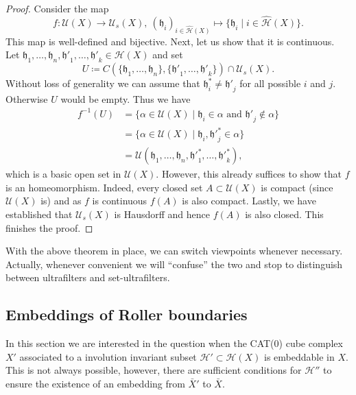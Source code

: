 \begin{proof}
  Consider the map
  \[
    f\colon \mathcal{U}(X) \to \mathcal{U}_s(X),\ (\mathfrak{h}_i)_{i \in \mathcal{\hat H}(X)} \mapsto \{\mathfrak{h}_i \mid i \in \mathcal{\hat H}(X)\}.
  \]
  This map is well-defined and bijective. Next, let us show that it is continuous. Let \(\mathfrak{h}_1, \dots, \mathfrak{h}_n, \mathfrak{h'}_1, \dots,\mathfrak{h'}_k \in \mathcal{H}(X)\) and set
  \[
    U \coloneqq C(\{\mathfrak{h}_1, \dots, \mathfrak{h}_n\}, \{\mathfrak{h'}_1, \dots, \mathfrak{h'}_k\}) \cap \mathcal{U}_s(X).
  \]
  Without loss of generality we can assume that \(\mathfrak{h}^\ast_i \neq \mathfrak{h'}_j\) for all possible \(i\) and \(j\). Otherwise \(U\) would be empty. Thus we have
  \begin{align*}
    f^{-1}(U)
    & = \{\alpha \in \mathcal{U}(X) \mid \mathfrak{h}_i \in \alpha \text{ and } \mathfrak{h'}_j \notin \alpha\}\\
    & = \{\alpha \in \mathcal{U}(X) \mid \mathfrak{h}_i, \mathfrak{h'}^\ast_j \in \alpha\}\\
    & = \mathcal{U}(\mathfrak{h}_1, \dots, \mathfrak{h}_n, \mathfrak{h'}^\ast_1, \dots, \mathfrak{h'}^\ast_k),
  \end{align*}
  which is a basic open set in \(\mathcal{U}(X)\). However, this already suffices to show that \(f\) is an homeomorphism. Indeed, every closed set \(A \subset \mathcal{U}(X)\) is compact (since \(\mathcal{U}(X)\) is) and as \(f\) is continuous \(f(A)\) is also compact. Lastly, we have established that \(\mathcal{U}_s(X)\) is Hausdorff and hence \(f(A)\) is also closed. This finishes the proof.
\end{proof}

With the above theorem in place, we can switch viewpoints whenever necessary. Actually, whenever convenient we will \enquote{confuse} the two and stop to distinguish between ultrafilters and set-ultrafilters.

\subsection{Embeddings of Roller boundaries}
\label{sec:embedding-roller}

In this section we are interested in the question when the CAT(0) cube complex \(X'\) associated to a involution invariant subset \(\mathcal{H}' \subset \mathcal{H}(X)\) is embeddable in \(X\). This is not always possible, however, there are sufficient conditions for \(\mathcal{H}''\) to ensure the existence of an embedding from \(\bar X'\) to \(\bar X\).


